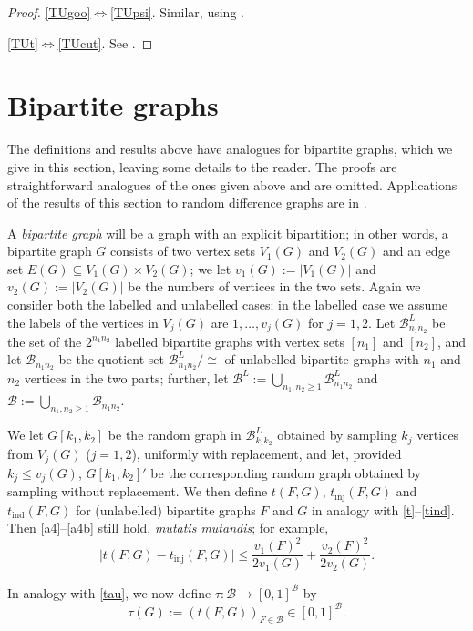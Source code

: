 \documentclass[11pt,reqno,tbtags]{amsart}
\numberwithin{equation}{section}
\theoremstyle{definition}
\theoremstyle{remark}
\newcommand\bigabs[1]{\bigl|#1\bigr|}
\newcommand\cB{\mathcal B}
\renewcommand{\=}{:=}
\newcommand\oi{[0,1]}
\newcommand{\tinj}{t_{\mathrm{inj}}}
\newcommand{\tind}{t_{\mathrm{ind}}}
\newcommand{\BU}{\cB}
\newcommand{\BUxx}[2]{\cB_{#1#2}}
\newcommand{\BUnn}{\BUxx{n_1}{n_2}}
\newcommand{\BL}{\cB^L}
\newcommand{\BLxx}[2]{\cB^L_{#1#2}}
\newcommand{\BLnn}{\BLxx{n_1}{n_2}}
\newcommand{\oib}{\oi^{\cB}}
\begin{document}
\begin{proof}
\ref{TUgoo}$\iff$\ref{TUpsi}. 
Similar, using \cite[Theorem 7.28(iii)]{Kallenberg:exch}.

\ref{TUt}$\iff$\ref{TUcut}. See \cite{BCL1}.
\end{proof}




\section{Bipartite graphs}\label{Sbip}

The definitions and results above have analogues for bipartite
graphs, which we give in this section, leaving some details to the reader.
The proofs are straightforward analogues of the ones given above and
are omitted.
Applications of the results of
this section to random difference graphs are in 
\cite{threshold}.

A \emph{bipartite graph} will be a graph with an explicit bipartition; in
other words, a bipartite graph $G$ consists of two vertex sets
$V_1(G)$ and $V_2(G)$ and an edge set $E(G)\subseteq V_1(G)\times
V_2(G)$; we let $v_1(G)\=|V_1(G)|$ and $v_2(G)\=|V_2(G)|$ be the
numbers of vertices in the two sets.
Again we consider both the labelled and unlabelled cases; in the
labelled case we assume the labels of the vertices in $V_j(G)$ are
$1,\dots,v_j(G)$ for $j=1,2$.
Let $\BLnn$ be the set of the $2^{n_1n_2}$ labelled bipartite graphs
with vertex sets $[n_1]$ and $[n_2]$, and let $\BUnn$ be the quotient
set $\BLnn/\cong$ of unlabelled bipartite graphs with $n_1$ and $n_2$
vertices in the two parts; further, let
$\BL\=\bigcup_{n_1,n_2\ge1}\BLnn$ and $\BU\=\bigcup_{n_1,n_2\ge1}\BUnn$.

We let $G[k_1,k_2]$ be the random graph in $\BLxx{k_1}{k_2}$ obtained
by sampling $k_j$ vertices from $V_j(G)$ ($j=1,2$), uniformly with
replacement, and let, provided $k_j\le v_j(G)$, 
$G[k_1,k_2]'$ be the corresponding random graph obtained by sampling
without replacement. We then define
$t(F,G)$, $\tinj(F,G)$ and $\tind(F,G)$ 
for (unlabelled) bipartite graphs $F$ and $G$
in analogy with \eqref{t}--\eqref{tind}.
Then \eqref{a4}--\eqref{a4b} still hold, \emph{mutatis mutandis}; for
example,
\begin{equation}
  \label{a4xx}
\bigabs{t(F,G)-\tinj(F,G)}
\le\frac{v_1(F)^2}{2v_1(G)}+\frac{v_2(F)^2}{2v_2(G)}.
\end{equation}

In analogy with \eqref{tau}, we now define $\tau:\BU\to\oib$ by
\begin{equation}\label{taub}
  \tau(G)\=(t(F,G))_{F\in\cB}\in\oib. 
\end{equation}
\end{document}
